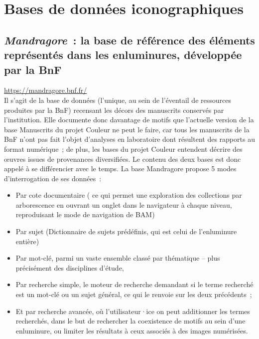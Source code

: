 \documentclass[a4paper,12pt, twoside]{book}
\begin{document}
\section*{Bases de données iconographiques}

\subsection*{\textit{Mandragore}~: la base de référence des éléments représentés dans les enluminures, développée par la BnF}

\url{https://mandragore.bnf.fr/}\\

Il s’agit de la base de données (l’unique, au sein de l’éventail de ressources produites par la BnF) recensant les décors des manuscrits conservés par l’institution. Elle documente donc davantage de motifs que l’actuelle version de la base Manuscrits du projet Couleur ne peut le faire, car tous les manuscrits de la BnF n’ont pas fait l’objet d’analyses en laboratoire dont résultent des rapports au format numérique~; de plus, les bases du projet Couleur entendent décrire des œuvres issues de provenances diversifiées. Le contenu des deux bases est donc appelé à se différencier avec le temps. La base Mandragore propose 5 modes d’interrogation de ses données~:

\begin{itemize}
    \item Par cote documentaire ( ce qui permet une exploration des collections par arborescence en ouvrant un onglet dans le navigateur à chaque niveau, reproduisant le mode de navigation de BAM)\\

    \item Par sujet (Dictionnaire de sujets prédéfinis, qui est celui de l’enluminure entière)\\

    \item Par mot-clé, parmi un vaste ensemble classé par thématique – plus précisément des disciplines d’étude,\\

    \item Par recherche simple, le moteur de recherche demandant si le terme recherché est un mot-clé ou un sujet général, ce qui le renvoie sur les deux précédents~;\\

    \item Et par recherche avancée, où l’utilisateur·ice on peut additionner les termes recherchés, dans le but de rechercher la coexistence de motifs au sein d’une enluminure, ou limiter les résultats à ceux associés à des images numérisées.
\end{itemize}
\end{document}
